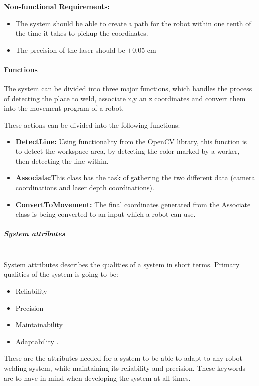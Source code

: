 \textbf{Non-functional Requirements:}

\begin{itemize}

\item The system should be able to create a path for the robot within one tenth of the time it takes to pickup the coordinates.
\item The precision of the laser should be $\pm$0.05 cm

\end{itemize}

\paragraph*{Functions}

The system can be divided into three major functions, which handles the process of detecting the place to weld, associate x,y an z coordinates and convert them into the movement program of a robot.

These actions can be divided into the following functions:

\begin{itemize}

\item \textbf{DetectLine:} Using functionality from the OpenCV library, this function is to detect the workspace area, by detecting the color marked by a worker, then detecting the line within.
\item \textbf{Associate:}This class has the task of gathering the two different data (camera coordinations and laser depth coordinations).
\item \textbf{ConvertToMovement:} The final coordinates generated from the Associate class is being converted to an input which a robot can use. 

\end{itemize}

\subparagraph*{System attributes}~\\
System attributes describes the qualities of a system in short terms. Primary qualities of the system is going to be:

\begin{itemize}

\item Reliability
\item Precision
\item Maintainability
\item Adaptability
. 
\end{itemize}
These are the attributes needed for a system to be able to adapt to any robot welding system, while maintaining its reliability and precision. These keywords are to have in mind when developing the system at all times.

